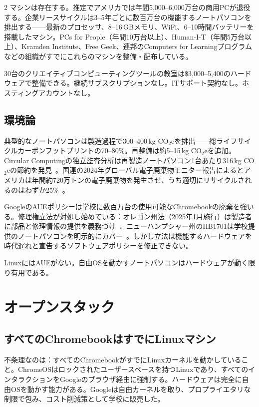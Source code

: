 \documentclass[11pt, a4paper]{article}
\begin{document}
\begin{multicols}{2}
マシンは存在する。推定でアメリカでは年間5,000--6,000万台の商用PCが退役する。企業リースサイクルは3--5年ごとに数百万台の機能するノートパソコンを排出する——最新のプロセッサ、8--16\,GBメモリ、WiFi、6--10時間バッテリーを搭載したマシン。PCs for People（年間10万台以上）、Human-I-T（年間5万台以上）、Kramden Institute、Free Geek、連邦のComputers for Learningプログラムなどの組織がすでにこれらのマシンを整備・配布している。

30台のクリエイティブコンピューティングツールの教室は\$3,000--5,400のハードウェアで整備できる。継続サブスクリプションなし。ITサポート契約なし。ホスティングアカウントなし。

\subsection{環境論}

典型的なノートパソコンは製造過程で300--400\,kg CO$_2$eを排出——総ライフサイクルカーボンフットプリントの70--80\%。再整備は約5--15\,kg CO$_2$eを追加。Circular Computingの独立監査分析は再製造ノートパソコン1台あたり316\,kg CO$_2$eの節約を発見~\citep{circularcomputing2023carbon}。国連の2024年グローバル電子廃棄物モニター報告によるとアメリカは年間約720万トンの電子廃棄物を発生させ、うち適切にリサイクルされるのはわずか25\%~\citep{un2024ewaste}。

GoogleのAUEポリシーは学校に数百万台の使用可能なChromebookの廃棄を強いる。修理権立法が対処し始めている：オレゴン州法（2025年1月施行）は製造者に部品と修理情報の提供を義務づけ~\citep{oregon2024repair}、ニューハンプシャー州のHB1701は学校提供のノートパソコンを明示的にカバー~\citep{newhampshire2024repair}。しかし立法は機能するハードウェアを時代遅れと宣告するソフトウェアポリシーを修正できない。

LinuxにはAUEがない。自由OSを動かすノートパソコンはハードウェアが動く限り有用である。


\section{オープンスタック}

\subsection{すべてのChromebookはすでにLinuxマシン}

不条理なのは：すべてのChromebookがすでにLinuxカーネルを動かしていること。ChromeOSはロックされたユーザースペースを持つLinuxであり、すべてのインタラクションをGoogleのブラウザ経由に強制する。ハードウェアは完全に自由OSを動かす能力がある。Googleは自由カーネルを取り、プロプライエタリな制限で包み、コスト削減策として学校に販売した。


\end{multicols}
\end{document}
